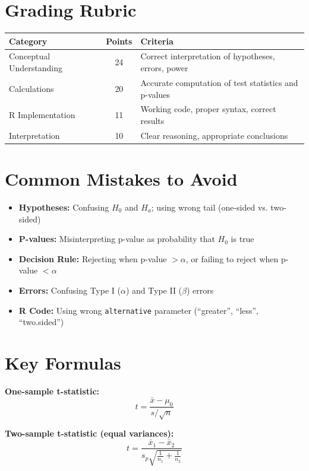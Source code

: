 \documentclass[11pt]{article}
\begin{document}
\section*{Grading Rubric}

\begin{table}[h]
\centering
\begin{tabular}{lcp{8cm}}
\toprule
\textbf{Category} & \textbf{Points} & \textbf{Criteria} \\
\midrule
Conceptual Understanding & 24 & Correct interpretation of hypotheses, errors, power \\
Calculations & 20 & Accurate computation of test statistics and p-values \\
R Implementation & 11 & Working code, proper syntax, correct results \\
Interpretation & 10 & Clear reasoning, appropriate conclusions \\
\bottomrule
\end{tabular}
\end{table}

\section*{Common Mistakes to Avoid}

\begin{itemize}
\item \textbf{Hypotheses:} Confusing $H_0$ and $H_a$; using wrong tail (one-sided vs. two-sided)
\item \textbf{P-values:} Misinterpreting p-value as probability that $H_0$ is true
\item \textbf{Decision Rule:} Rejecting when p-value $> \alpha$, or failing to reject when p-value $< \alpha$
\item \textbf{Errors:} Confusing Type I ($\alpha$) and Type II ($\beta$) errors
\item \textbf{R Code:} Using wrong \texttt{alternative} parameter (``greater'', ``less'', ``two.sided'')
\end{itemize}

\section*{Key Formulas}

\textbf{One-sample t-statistic:}
$$t = \frac{\bar{x} - \mu_0}{s / \sqrt{n}}$$

\textbf{Two-sample t-statistic (equal variances):}
$$t = \frac{\bar{x}_1 - \bar{x}_2}{s_p\sqrt{\frac{1}{n_1} + \frac{1}{n_2}}}$$
\end{document}
